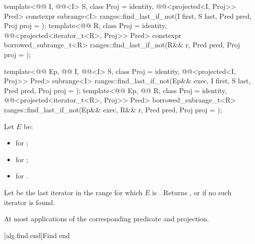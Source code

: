 \begin{itemdecl}
template<@@ I, @@<I> S, class Proj = identity,
         @@<projected<I, Proj>> Pred>
  constexpr subrange<I> ranges::find_last_if_not(I first, S last, Pred pred, Proj proj = {});
template<@@ R, class Proj = identity,
         @@<projected<iterator_t<R>, Proj>> Pred>
  constexpr borrowed_subrange_t<R> ranges::find_last_if_not(R&& r, Pred pred, Proj proj = {});

template<@@ Ep, @@ I, @@<I> S,
         class Proj = identity,
         @@<projected<I, Proj>> Pred>
  subrange<I> ranges::find_last_if_not(Ep&& exec, I first, S last, Pred pred, Proj proj = {});
template<@@ Ep, @@ R, class Proj = identity,
         @@<projected<iterator_t<R>, Proj>> Pred>
  borrowed_subrange_t<R> ranges::find_last_if_not(Ep&& exec, R&& r, Pred pred, Proj proj = {});
\end{itemdecl}

\begin{itemdescr}
\pnum
Let $E$ be:
\begin{itemize}
\item
{} for ;
\item
{} for ;
\item
{} for .
\end{itemize}

\pnum
\returns
Let  be the last iterator in the range 
for which $E$ is .
Returns , or
 if no such iterator is found.

\pnum
\complexity
At most  applications of
the corresponding predicate and projection.
\end{itemdescr}

[alg.find.end]{Find end}

